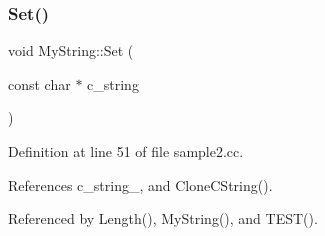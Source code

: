 \mbox{\label{classMyString_a521c4cd7eccac6ce554d8a51505e4970}} 
\subsubsection{\texorpdfstring{Set()}{Set()}}
{\footnotesize\ttfamily void My\+String\+::\+Set (\begin{DoxyParamCaption}\item[{const char $\ast$}]{c\+\_\+string }\end{DoxyParamCaption})}



Definition at line 51 of file sample2.\+cc.



References c\+\_\+string\+\_\+, and Clone\+C\+String().



Referenced by Length(), My\+String(), and T\+E\+S\+T().


